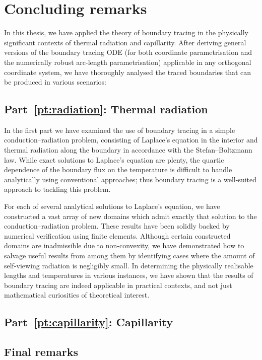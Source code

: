 \chapter{Concluding remarks}
\label{ch:concluding}

In this thesis,
we have applied the theory of boundary tracing
in the physically significant contexts
of thermal radiation and capillarity.
After deriving general versions of the boundary tracing ODE
(for both coordinate parametrisation
and the numerically robust arc-length parametrisation)
applicable in any orthogonal coordinate system,
we have thoroughly analysed
the traced boundaries that can be produced in various scenarios:

\section{Part~\ref*{pt:radiation}: Thermal radiation}
\label{sec:concluding.radiation}

In the first part we have examined the use of boundary tracing
in a simple conduction--radiation problem,
consisting of Laplace's equation in the interior
and thermal radiation along the boundary
in accordance with the Stefan--Boltzmann law.
While exact solutions to Laplace's equation are plenty,
the quartic dependence of the boundary flux on the temperature
is difficult to handle analytically using conventional approaches;
thus boundary tracing is a well-suited approach to tackling this problem.

For each of several analytical solutions to Laplace's equation,
we have constructed a vast array of new domains
which admit exactly that solution
to the conduction--radiation problem.
These results have been solidly backed
by numerical verification using finite elements.
Although certain constructed domains are inadmissible
due to non-convexity,
we have demonstrated how to salvage useful results from among them
by identifying cases
where the amount of self-viewing radiation is negligibly small.
In determining the physically realisable lengths and temperatures
in various instances,
we have shown that the results of boundary tracing
are indeed applicable in practical contexts,
and not just mathematical curiosities of theoretical interest.


\section{Part~\ref*{pt:capillarity}: Capillarity}
\label{sec:concluding.capillarity}

\section{Final remarks}
\label{sec:concluding.final}
